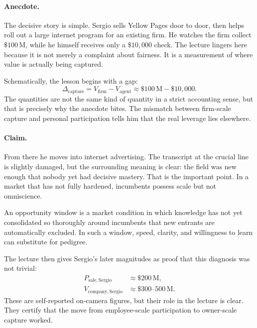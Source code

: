 \paragraph{Anecdote.}
The decisive story is simple. Sergio sells Yellow Pages door to door, then helps roll out a large internet program for an existing firm. He watches the firm collect \(\$100\,\mathrm{M}\), while he himself receives only a \(\$10{,}000\) check. The lecture lingers here because it is not merely a complaint about fairness. It is a measurement of where value is actually being captured.

Schematically, the lesson begins with a gap:
\begin{equation}
\Delta_{\mathrm{capture}}
=
V_{\mathrm{firm}} - V_{\mathrm{agent}}
\approx
\$100\,\mathrm{M} - \$10{,}000.
\end{equation}
The quantities are not the same kind of quantity in a strict accounting sense, but that is precisely why the anecdote bites. The mismatch between firm-scale capture and personal participation tells him that the real leverage lies elsewhere.

\paragraph{Claim.}
From there he moves into internet advertising. The transcript at the crucial line is slightly damaged, but the surrounding meaning is clear: the field was new enough that nobody yet had decisive mastery. That is the important point. In a market that has not fully hardened, incumbents possess scale but not omniscience.

\begin{definition}
An opportunity window is a market condition in which knowledge has not yet consolidated so thoroughly around incumbents that new entrants are automatically excluded. In such a window, speed, clarity, and willingness to learn can substitute for pedigree.
\end{definition}

The lecture then gives Sergio's later magnitudes as proof that this diagnosis was not trivial:
\begin{align}
P_{\mathrm{sale,Sergio}} &\approx \$200\,\mathrm{M},\\
V_{\mathrm{company,Sergio}} &\approx \$300\text{--}500\,\mathrm{M}.
\end{align}
These are self-reported on-camera figures, but their role in the lecture is clear. They certify that the move from employee-scale participation to owner-scale capture worked.

